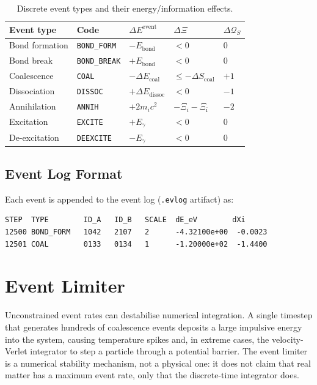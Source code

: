 \documentclass[11pt,a4paper]{article}
\newcommand{\Rec}{\Xi}
\newcommand{\Quota}{\mathcal{Q}}
\begin{document}
\begin{table}[H]
\centering
\caption{Discrete event types and their energy/information effects.}
\label{tab:events}
\begin{tabular}{@{}lllll@{}}
\toprule
Event type & Code & $\Delta E^{\mathrm{event}}$ & $\Delta\Rec$ & $\Delta\Quota_S$ \\
\midrule
Bond formation & \texttt{BOND\_FORM} & $-E_{\mathrm{bond}}$ & $< 0$ & 0 \\
Bond break     & \texttt{BOND\_BREAK} & $+E_{\mathrm{bond}}$ & $< 0$ & 0 \\
Coalescence    & \texttt{COAL} & $-\Delta E_{\mathrm{coal}}$ & $\leq -\Delta S_{\mathrm{coal}}$ & $+1$ \\
Dissociation   & \texttt{DISSOC} & $+\Delta E_{\mathrm{dissoc}}$ & $< 0$ & $-1$ \\
Annihilation   & \texttt{ANNIH} & $+2m_ic^2$ & $-\Rec_i - \Rec_{\bar\imath}$ & $-2$ \\
Excitation     & \texttt{EXCITE} & $+E_\gamma$ & $< 0$ & 0 \\
De-excitation  & \texttt{DEEXCITE} & $-E_\gamma$ & $< 0$ & 0 \\
\bottomrule
\end{tabular}
\end{table}

\subsection{Event Log Format}

Each event is appended to the event log (\texttt{.evlog} artifact) as:
\begin{lstlisting}
STEP  TYPE        ID_A   ID_B   SCALE  dE_eV        dXi
12500 BOND_FORM   1042   2107   2      -4.32100e+00  -0.0023
12501 COAL        0133   0134   1      -1.20000e+02  -1.4400
\end{lstlisting}

\section{Event Limiter}\label{sec:limiter}

Unconstrained event rates can destabilise numerical integration.  A single
timestep that generates hundreds of coalescence events deposits a large
impulsive energy into the system, causing temperature spikes and, in extreme
cases, the velocity-Verlet integrator to step a particle through a potential
barrier.  The event limiter is a numerical stability mechanism, not a physical
one: it does not claim that real matter has a maximum event rate, only that
the discrete-time integrator does.
\end{document}
